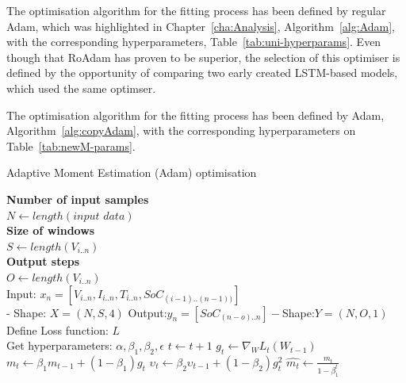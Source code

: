%
%
{
    The optimisation algorithm for the fitting process has been defined by regular Adam, which was highlighted in Chapter~\ref{cha:Analysis}, \mbox{Algorithm~\ref{alg:Adam}}, with the corresponding hyperparameters, \mbox{Table~\ref{tab:uni-hyperparams}}.
    Even though that RoAdam has proven to be superior, the selection of this optimiser is defined by the opportunity of comparing two early created LSTM-based models, which used the same optimser.
}
{
    The optimisation algorithm for the fitting process has been defined by Adam, \mbox{Algorithm~\ref{alg:copyAdam}}, with the corresponding hyperparameters on \mbox{Table~\ref{tab:newM-params}}.
    \begin{algorithm}
        \caption{Adaptive Moment Estimation (Adam) optimisation}
        \begin{algorithmic}[1]
            \STATE \textbf{Number of input samples} \\ $N\gets length(\textit{input data})$\\
            \STATE \textbf{Size of windows} \\ $S\gets length(V_{i..n})$\\
            \STATE \textbf{Output steps} \\ $O\gets length(V_{i..n})$\\
            \STATE Input: $x_n = [V_{i..n}, I_{i..n}, T_{i..n}, SoC_{(i-1)..(n-1))}]$ \\
            - Shape: $X = (N, S, 4)$
            \STATE Output:$y_n = [SoC_{(n-o)..n}] - $Shape:$Y = (N, O, 1)$
            \STATE Define Loss function: $L$ \\
                    Get hyperparameters: $\alpha, \beta_1, \beta_2, \epsilon$
            \STATE $t \gets t+1$
            \STATE $g_t \gets \nabla_W L_t (W_{t-1})$ 
            \STATE $m_t \gets \beta_1 m_{t-1}+(1-\beta_1) g_t $ 
            \STATE $\upsilon_t \gets \beta_2 \upsilon_{t-1}+ \left(1-\beta_2 \right)g^2_t $ 
            \STATE $\hat{m_t} \gets \frac{m_t}{1-\beta^t_1}$ 

\end{algorithmic}
\end{algorithm}}
